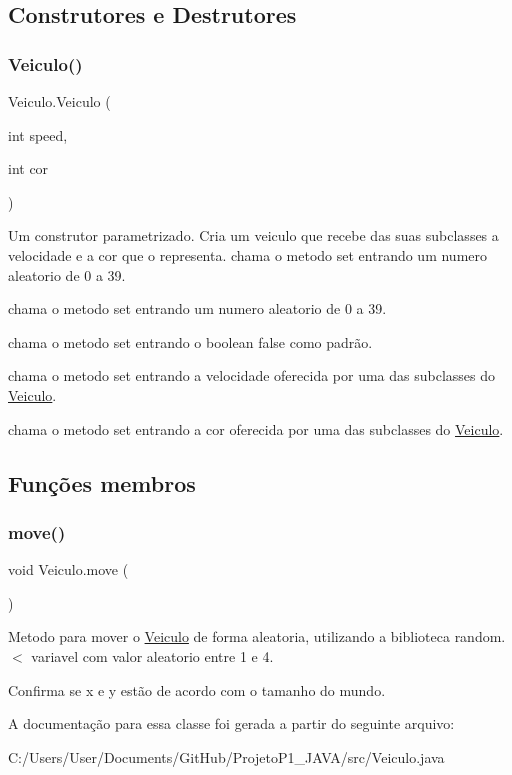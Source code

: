 \subsection{Construtores e Destrutores}
\mbox{\label{class_veiculo_a67a7ce6d304cf4062c642a1071ab0dbf}} 
\subsubsection{\texorpdfstring{Veiculo()}{Veiculo()}}
{\footnotesize\ttfamily Veiculo.\+Veiculo (\begin{DoxyParamCaption}\item[{int}]{speed,  }\item[{int}]{cor }\end{DoxyParamCaption})\hspace{0.3cm}{\ttfamily [inline]}}

Um construtor parametrizado. Cria um veiculo que recebe das suas subclasses a velocidade e a cor que o representa. chama o metodo set entrando um numero aleatorio de 0 a 39.

chama o metodo set entrando um numero aleatorio de 0 a 39.

chama o metodo set entrando o boolean false como padrão.

chama o metodo set entrando a velocidade oferecida por uma das subclasses do \mbox{\hyperlink{class_veiculo}{Veiculo}}.

chama o metodo set entrando a cor oferecida por uma das subclasses do \mbox{\hyperlink{class_veiculo}{Veiculo}}. 

\subsection{Funções membros}
\mbox{\label{class_veiculo_a3341b0ed6b4d34db990a31f7a499ae80}} 
\subsubsection{\texorpdfstring{move()}{move()}}
{\footnotesize\ttfamily void Veiculo.\+move (\begin{DoxyParamCaption}{ }\end{DoxyParamCaption})\hspace{0.3cm}{\ttfamily [inline]}}

Metodo para mover o \mbox{\hyperlink{class_veiculo}{Veiculo}} de forma aleatoria, utilizando a biblioteca random. $<$ variavel com valor aleatorio entre 1 e 4.

Confirma se x e y estão de acordo com o tamanho do mundo. 

A documentação para essa classe foi gerada a partir do seguinte arquivo\+:\begin{DoxyCompactItemize}
\item 
C\+:/\+Users/\+User/\+Documents/\+Git\+Hub/\+Projeto\+P1\+\_\+\+J\+A\+V\+A/src/Veiculo.\+java\end{DoxyCompactItemize}
